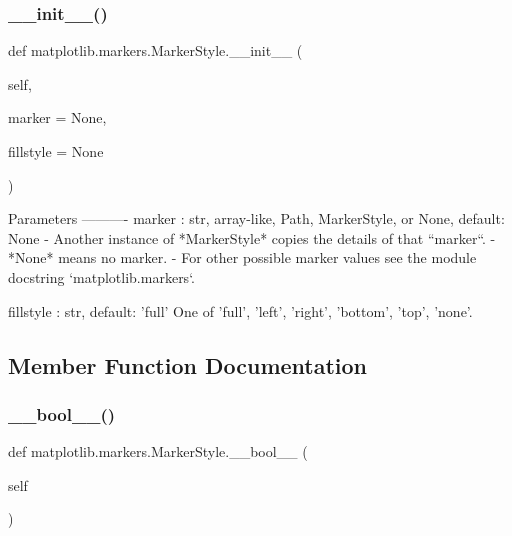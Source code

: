 \subsubsection{\texorpdfstring{\+\_\+\+\_\+init\+\_\+\+\_\+()}{\_\_init\_\_()}}
{\footnotesize\ttfamily def matplotlib.\+markers.\+Marker\+Style.\+\_\+\+\_\+init\+\_\+\+\_\+ (\begin{DoxyParamCaption}\item[{}]{self,  }\item[{}]{marker = {\ttfamily None},  }\item[{}]{fillstyle = {\ttfamily None} }\end{DoxyParamCaption})}

\begin{DoxyVerb}Parameters
----------
marker : str, array-like, Path, MarkerStyle, or None, default: None
    - Another instance of *MarkerStyle* copies the details of that
      ``marker``.
    - *None* means no marker.
    - For other possible marker values see the module docstring
      `matplotlib.markers`.

fillstyle : str, default: 'full'
    One of 'full', 'left', 'right', 'bottom', 'top', 'none'.
\end{DoxyVerb}
 

\subsection{Member Function Documentation}
\mbox{\label{classmatplotlib_1_1markers_1_1MarkerStyle_aad8a93f086c2f67539605f5ce5fb1ef1}} 
\subsubsection{\texorpdfstring{\+\_\+\+\_\+bool\+\_\+\+\_\+()}{\_\_bool\_\_()}}
{\footnotesize\ttfamily def matplotlib.\+markers.\+Marker\+Style.\+\_\+\+\_\+bool\+\_\+\+\_\+ (\begin{DoxyParamCaption}\item[{}]{self }\end{DoxyParamCaption})}

\mbox{\label{classmatplotlib_1_1markers_1_1MarkerStyle_a4bde29b71b22ca33d619d28124862721}} 
